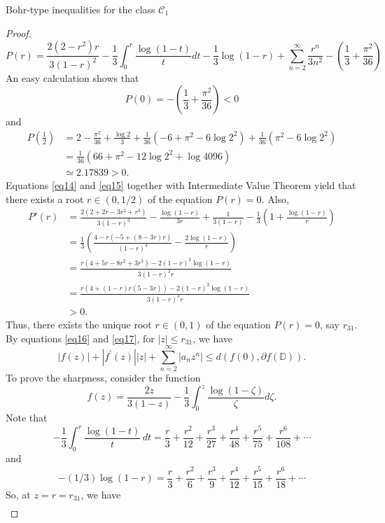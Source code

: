 \documentclass[12pt,a4paper,reqno]{amsart}
\theoremstyle{definition}
\theoremstyle{plain}
\numberwithin{equation}{section}
\begin{document}
\begin{section}{Bohr-type inequalities for the class $\mathcal{C}_1$}
\begin{proof}
\begin{equation*}
P(r)=\frac{2 (2-r^2) r}{3 (1-r)^2}-\frac{1}{3} \int_{0}^{r} \frac{\log(1-t)}{t} dt-\frac{1}{3} \log(1-r)+ \sum_{n=2}^{\infty} \frac{r^n}{3 n^2}-\left(\frac{1}{3}+\frac{\pi ^2}{36}\right)
\end{equation*}
An easy calculation shows that
\begin{equation}\label{eq14}
P(0)=-\left(\frac{1}{3}+\frac{\pi ^2}{36}\right)<0
\end{equation}
and
\begin{align}\label{eq15}
P\left(\frac{1}{2}\right)&=2-\frac{\pi ^2}{36}+\frac{\log2}{3}+\frac{1}{36} \left(-6+\pi ^2-6 \log 2^2\right)+\frac{1}{36} \left(\pi ^2-6 \log 2^2\right)\nonumber\\
&=\frac{1}{36} \left(66+\pi ^2-12 \log 2^2+\log4096\right)\nonumber\\
&\simeq2.17839>0.
\end{align}
Equations \eqref{eq14} and \eqref{eq15} together with Intermediate Value Theorem yield that there exists a root $r\in(0, 1/2)$ of the equation $P(r)=0.$
Also,
\begin{align*}
P'(r)&=\frac{2 \left(2+2 r-3 r^2+r^3\right)}{3 (1-r)^3}-\frac{\log(1-r)}{3r}+\frac{1}{3 (1-r)}-\frac{1}{3} \left(1+\frac{\log(1-r)}{r}\right)\\
&=\frac{1}{3} \left(\frac{4-r (-5+(8-3 r) r)}{(1-r)^3}-\frac{2 \log(1-r)}{r}\right)\\
&=\frac{r \left(4+5 r-8 r^2+3 r^3\right)-2 (1-r)^3 \log(1-r)}{3 (1-r)^3 r}\\
&=\frac{r \left(4+(1-r) r (5-3 r)\right)-2 (1-r)^3 \log(1-r)}{3 (1-r)^3 r}\\
&>0.
\end{align*}
Thus, there exists the  unique  root $r\in(0, 1)$ of the equation $P(r)=0$, say $r_{31}$. By equations \eqref{eq16} and \eqref{eq17}, for $|z|\leq r_{31}$, we have
\[|f(z)| + |f^{'}(z)||z| + \sum_{n=2}^{\infty} |a_n z^n| \le d( f(0), \partial{f(\mathbb{D})}).\]
To prove the sharpness, consider the function
\begin{equation*}
    f(z)= \frac{2z}{3(1-z)} - \frac{1}{3} \int_{0}^{z} \frac{\log(1-\zeta)}{\zeta} d\zeta.
\end{equation*}
Note that
\[-\frac{1}{3}\int_0^r \frac{\log(1-t)}{t} \, dt=\frac{r}{3}+\frac{r^2}{12}+\frac{r^3}{27}+\frac{r^4}{48}+\frac{r^5}{75}+\frac{r^6}{108}+\cdots\]
and \[-(1/3) \log(1 - r)=\frac{r}{3}+\frac{r^2}{6}+\frac{r^3}{9}+\frac{r^4}{12}+\frac{r^5}{15}+\frac{r^6}{18}+\cdots\]
So, at  $z=r=r_{31}$, we have
\begin{align*}

\end{align*}
\end{proof}
\end{section}
\end{document}
